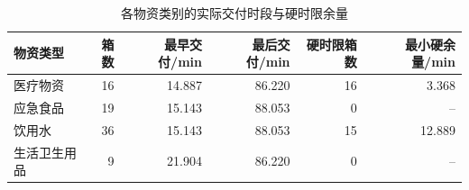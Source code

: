 \begin{table}[htbp]\centering\small
\caption{各物资类别的实际交付时段与硬时限余量}\label{tab:rev_delivery_kind}
\begin{tabular}{lrrrrr}\toprule
物资类型 & 箱数 & 最早交付/min & 最后交付/min & 硬时限箱数 & 最小硬余量/min\\\midrule
医疗物资 & 16 & 14.887 & 86.220 & 16 & 3.368\\
应急食品 & 19 & 15.143 & 88.053 & 0 & --\\
饮用水 & 36 & 15.143 & 88.053 & 15 & 12.889\\
生活卫生用品 & 9 & 21.904 & 86.220 & 0 & --\\
\bottomrule\end{tabular}
\end{table}
